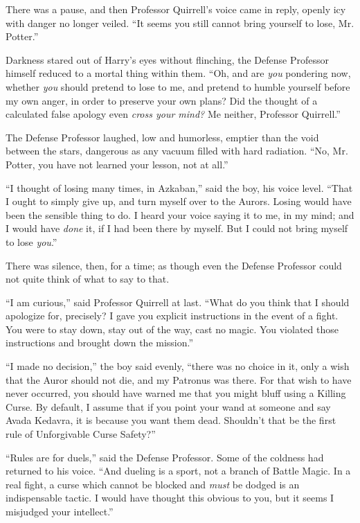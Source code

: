 There was a pause, and then Professor Quirrell's voice came in reply, openly icy with danger no longer veiled. ``It seems you still cannot bring yourself to lose, Mr. Potter.''

Darkness stared out of Harry's eyes without flinching, the Defense Professor himself reduced to a mortal thing within them. ``Oh, and are \emph{you} pondering now, whether \emph{you} should pretend to lose to me, and pretend to humble yourself before my own anger, in order to preserve your own plans? Did the thought of a calculated false apology even \emph{cross your mind?} Me neither, Professor Quirrell.''

The Defense Professor laughed, low and humorless, emptier than the void between the stars, dangerous as any vacuum filled with hard radiation. ``No, Mr. Potter, you have not learned your lesson, not at all.''

``I thought of losing many times, in Azkaban,'' said the boy, his voice level. ``That I ought to simply give up, and turn myself over to the Aurors. Losing would have been the sensible thing to do. I heard your voice saying it to me, in my mind; and I would have \emph{done} it, if I had been there by myself. But I could not bring myself to lose \emph{you}.''

There was silence, then, for a time; as though even the Defense Professor could not quite think of what to say to that.

``I am curious,'' said Professor Quirrell at last. ``What do you think that I should apologize for, precisely? I gave you explicit instructions in the event of a fight. You were to stay down, stay out of the way, cast no magic. You violated those instructions and brought down the mission.''

``I made no decision,'' the boy said evenly, ``there was no choice in it, only a wish that the Auror should not die, and my Patronus was there. For that wish to have never occurred, you should have warned me that you might bluff using a Killing Curse. By default, I assume that if you point your wand at someone and say Avada Kedavra, it is because you want them dead. Shouldn't that be the first rule of Unforgivable Curse Safety?''

``Rules are for duels,'' said the Defense Professor. Some of the coldness had returned to his voice. ``And dueling is a sport, not a branch of Battle Magic. In a real fight, a curse which cannot be blocked and \emph{must} be dodged is an indispensable tactic. I would have thought this obvious to you, but it seems I misjudged your intellect.''


